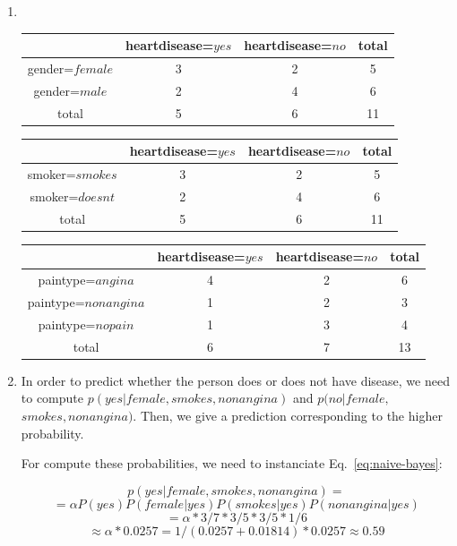 \begin{enumerate}

\item \


\begin{tabular}{|c|c|c|c|}\hline
& heartdisease=$yes$ & heartdisease=$no$ & total \\ \hline
gender=$female$ & 3 & 2 & 5 \\ \hline
gender=$male$ & 2 & 4 & 6 \\ \hline
total & 5 & 6 & 11 \\ \hline
\end{tabular}

\vspace{0.5cm}

\begin{tabular}{|c|c|c|c|}\hline
& heartdisease=$yes$ & heartdisease=$no$ & total \\ \hline
smoker=$smokes$ & 3 & 2 & 5 \\ \hline
smoker=$doesnt$ & 2 & 4 & 6 \\ \hline
total & 5 & 6 & 11 \\ \hline
\end{tabular}

\vspace{0.5cm}

\begin{tabular}{|c|c|c|c|}\hline
& heartdisease=$yes$ & heartdisease=$no$ & total \\ \hline
paintype=$angina$& 4 & 2 & 6 \\ \hline
paintype=$nonangina$& 1 & 2 & 3 \\ \hline
paintype=$nopain$ & 1 & 3 & 4 \\ \hline
total & 6 & 7 & 13 \\ \hline
\end{tabular}

\vspace{0.5cm}

\item  In order to predict whether the person does or does not have disease, we need to compute $p(yes|female,smokes,nonangina)$ and $p(no|female,$ $smokes,nonangina)$. Then, we give a prediction corresponding to the higher probability.

For compute these probabilities, we need to instanciate Eq.~\ref{eq:naive-bayes}:

\[p(yes|female,smokes,nonangina) =\]
\[= \alpha P(yes) P(female|yes) P(smokes|yes) P(nonangina|yes)\]
\[= \alpha * 3/7 * 3/5 * 3/5 * 1/6\]
\[\approx \alpha * 0.0257 = 1 / (0.0257 + 0.01814) * 0.0257 \approx 0.59\]


\end{enumerate}
